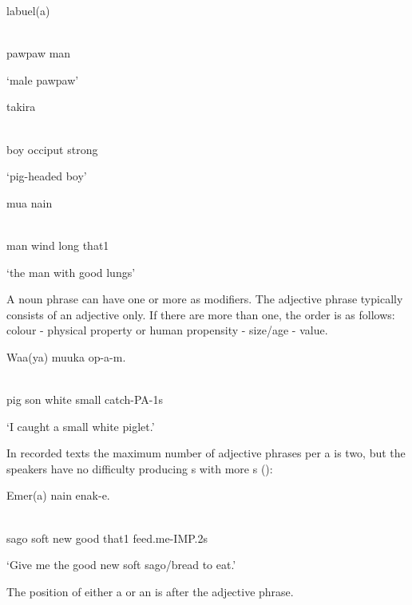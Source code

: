 \ea%
\label{ex:x416}
\gll labuel(a)   \\
      \\
\glt
\z

pawpaw  man

`male pawpaw'

\ea%
\label{ex:x417}
\gll takira   \\
      \\
\glt
\z

boy  occiput  strong

`pig-headed boy'

\ea%
\label{ex:x418}
\gll mua    nain  \\
      \\
\glt
\z

man  wind  long  that1

`the man with good lungs'

A noun phrase can have one or more  as modifiers. The adjective phrase typically consists of an adjective only. If there are more  than one, the order is as follows: colour - physical property or human propensity - size/age - value.

\ea%
\label{ex:x419}
\gll Waa(ya)  muuka    op-a-m. \\
      \\
\glt
\z

pig  son  white  small  catch-PA-1s

`I caught  a small white piglet.'

In recorded texts the maximum number of adjective phrases per a  is two, but the speakers have no difficulty producing s with more s ():

\ea%
\label{ex:x420}
\gll Emer(a)    nain  enak-e. \\
      \\
\glt
\z

sago  soft  new  good  that1  feed.me-IMP.2s

`Give me the good new soft sago/bread to eat.'

The position of either a  or an  is after the adjective phrase.

